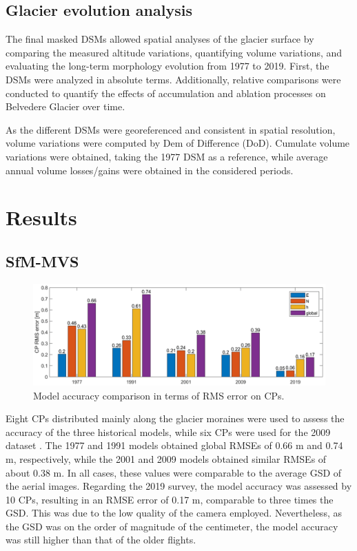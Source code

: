 \subsection{Glacier evolution analysis}\label{sec:2:glacier_evolution}

The final masked DSMs allowed spatial analyses of the glacier surface by comparing the measured altitude variations, quantifying volume variations, and evaluating the long-term morphology evolution from 1977 to 2019. 
First, the DSMs were analyzed in absolute terms.
Additionally, relative comparisons were conducted to quantify the effects of accumulation and ablation processes on Belvedere Glacier over time.

As the different DSMs were georeferenced and consistent in spatial resolution, volume variations were computed by Dem of Difference (DoD).
Cumulate volume variations were obtained, taking the 1977 DSM as a reference, while average annual volume losses/gains were obtained in the considered periods.

\section{Results}\label{sec:2:results}

\subsection{SfM-MVS}\label{sec:2:res_reconstruction}

\begin{figure}[hb]
    \centering
    \includegraphics[width=1\textwidth]{cp_error.png}
    \caption{Model accuracy comparison in terms of RMS error on CPs. }
    \label{fig:2:cp_error}
\end{figure}

Eight CPs distributed mainly along the glacier moraines were used to assess the accuracy of the three historical models, while six CPs were used for the 2009 dataset .
The 1977 and 1991 models obtained global RMSEs of 0.66 m and 0.74 m, respectively, while the 2001 and 2009 models obtained similar RMSEs of about 0.38 m.
In all cases, these values were comparable to the average GSD of the aerial images. Regarding the 2019 survey, the model accuracy was assessed by 10 CPs, resulting in an RMSE error of 0.17 m, comparable to three times the GSD. 
This was due to the low quality of the camera employed. 
Nevertheless, as the GSD was on the order of magnitude of the centimeter, the model accuracy was still higher than that of the older flights.

